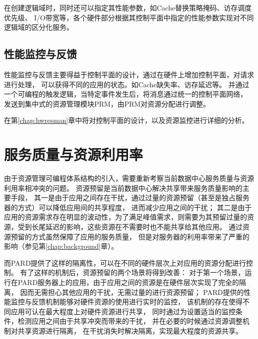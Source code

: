 在创建逻辑域时，同时还可以指定其性能参数，如Cache替换策略掩码、访存调度优先级、
I/O带宽等，各个硬件部分根据其控制平面中指定的性能参数实现对不同逻辑域的区分化服务。



\subsection{性能监控与反馈}

性能监控与反馈主要得益于控制平面的设计，通过在硬件上增加控制平面，对请求进行处理，
可以获得不同的应用的状态。如Cache缺失率、访存延迟等。
并通过一个可编程的触发逻辑，当特定事件发生后，将消息通过统一的控制平面网络，
发送到集中式的资源管理模块PRM，由PRM对资源分配进行调整。

在第\ref{chap:hwresman}章中将对控制平面的设计，以及资源监控进行详细的分析。


\fi


\section{服务质量与资源利用率}

由于资源管理可编程体系结构的引入，需要重新考察当前数据中心服务质量与资源利用率相冲突的问题。
资源预留是当前数据中心解决共享带来服务质量影响的主要手段，
其一是由于应用之间存在干扰，通过过量的资源预留（甚至是独占服务器的方式）可以降低应用间的共享程度，
进而减少应用之间的干扰；
其二是由于应用的资源需求存在明显的波动性，为了满足峰值需求，则需要为其预留过量的资源，受到长尾延迟的影响，这些资源在不需要时也不能共享给其他应用。
通过资源预留的方式虽然保障了应用的服务质量，
但是对服务器的利用率带来了严重的影响（参见第\ref{chap:background}章）。


而PARD提供了这样的隔离性，可以在不同的硬件层次上对应用的资源分配进行控制。
有了这样的机制后，资源预留的两个场景将得到改善：
对于第一个场景，运行在PARD服务器上的应用，由于应用之间的资源是在硬件层次实现了完全的隔离，
因而无需担心其他应用的干扰，无需过量的进行资源预留；
PARD提供的性能监控与反馈机制能够对硬件资源的使用进行实时的监控，
该机制的存在使得不同应用可认在最大程度上对硬件资源进行共享，
同时通过为设置适当的监控条件，检测应用之间由于共享冲突而带来的干扰， 
并在必要的时候通过资源调整机制对共享资源进行隔离，
在干扰消失时解决隔离，实现最大程度的资源共享。


